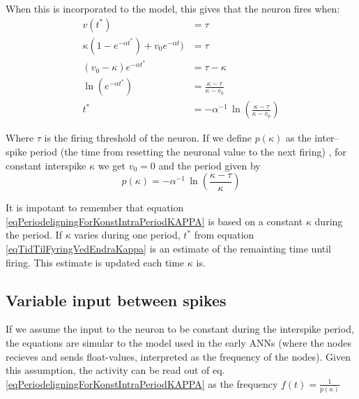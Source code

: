 When this is incorporated to the model, this gives that the neuron fires when:
\begin{equation}
	\label{eqTidTilFyringVedEndraKappa}
	\begin{split}
			v(t^*) 					 							&= \tau \qquad 										\\	%
			\kappa (1-e^{-\alpha t^*}) + v_0 e^{-\alpha t})		&= \tau 											\\
			(v_0-\kappa)e^{-\alpha t^*}							&= \tau-\kappa 										\\
			\ln \left(e^{-\alpha t^*}\right) 					&= \frac{\kappa - \tau}{\kappa - v_0} 					\\
			t^*													&= -\alpha^{-1} \, \ln \left( \frac{\kappa - \tau}{\kappa - v_0} \right) 					
	\end{split}
\end{equation}

Where $\tau$ is the firing threshold of the neuron. 
If we define $p(\kappa)$ as the inter--spike period (the time from resetting the neuronal value to the next firing)%
, for constant interspike $\kappa$ we get $v_0 = 0$ and the period given by
\begin{equation}
	\label{eqPeriodeligningForKonstIntraPeriodKAPPA}
	p(\kappa) = -\alpha^{-1} \, \ln(\frac{\kappa - \tau}{\kappa})
\end{equation}

It is impotant to remember that equation \eqref{eqPeriodeligningForKonstIntraPeriodKAPPA} is based on a constant $\kappa$ during the period. 
If $\kappa$ varies during one period, $t^*$ from equation \eqref{eqTidTilFyringVedEndraKappa} is an estimate of the remainting time until firing. This estimate is updated each time $\kappa$ is.



\subsection{Variable input between spikes}
\label{ssecVariableInputBetweenSpikes}
If we assume the input to the neuron to be constant during the interspike period, the equations are simular to the model used in the early ANNs (where the nodes recieves and sends float-values, interpreted as the frequency of the nodes).
Given this assumption, the activity can be read out of eq. \eqref{eqPeriodeligningForKonstIntraPeriodKAPPA} as the frequency $f(t) = \frac{1}{p(\kappa)}$

